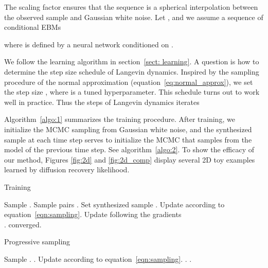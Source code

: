 \documentclass{article} \usepackage{iclr2021_conference,times}
\def\secref#1{section~\ref{#1}}
\def\eqref#1{equation~\ref{#1}}
\def\algref#1{algorithm~\ref{#1}}
\def\Algref#1{Algorithm~\ref{#1}}
\begin{document}
The scaling factor  ensures that the sequence is a spherical interpolation between the observed sample and Gaussian white noise. Let , and we assume a sequence of conditional EBMs

where  is defined by a neural network conditioned on . 

We follow the learning algorithm in \secref{sect: learning}. A question is how to determine the step size schedule  of Langevin dynamics. Inspired by the sampling procedure of the normal approximation (\eqref{eq:normal_approx}), we set the step size , where  is a tuned hyperparameter. This schedule turns out to work well in practice. Thus the  steps of Langevin dynamics iterates

\Algref{algo:1} summarizes the training procedure. After training, we initialize the MCMC sampling from Gaussian white noise, and the synthesized sample at each time step serves to initialize the MCMC that samples from the model of the previous time step. See \algref{algo:2}. To show the efficacy of our method, Figures \ref{fig:2d} and \ref{fig:2d_comp} display several 2D toy examples learned by diffusion recovery likelihood. 
\vspace{-.5cm}
\begin{center}
	\begin{minipage}[c]{.45\textwidth}
	\begin{algorithm}[H]
	\caption{Training}
	\label{algo:1}	
\begin{algorithmic}
	\REPEAT
	\STATE Sample .
	\STATE Sample pairs .
	\STATE Set synthesized sample .
	\STATE Update  according to \eqref{eqn:sampling}.
	\ENDFOR
	\STATE Update  following the gradients \\
	.
	\UNTIL converged.
\end{algorithmic}
\end{algorithm}
\end{minipage}
\hspace{3mm}
\begin{minipage}[c]{.45\textwidth}
	\begin{algorithm}[H]
	\caption{Progressive sampling}
	\label{algo:2}	
\begin{algorithmic}
	\STATE Sample .
	\STATE .
	\STATE Update  according to \eqref{eqn:sampling}.
	\ENDFOR
	\STATE .
	\ENDFOR
	\RETURN .
\end{algorithmic}
\end{algorithm}
\end{minipage}
\end{center}
\end{document}

